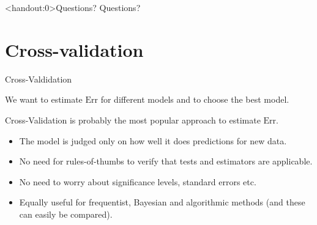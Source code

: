 \documentclass[10pt,handout]{beamer}
\begin{document}
\begin{frame}<handout:0>{Questions?}
Questions?
\end{frame}


\section{Cross-validation}
\frame{\sectionpage}


\begin{frame}{Cross-Valdidation}


We want to estimate $\text{Err}$ for different models and to choose the best model.\\[3mm]\pause

Cross-Validation is probably the most popular approach to estimate $\text{Err}$.

\begin{itemize}
\item The model is judged only on how well it does predictions for new data.\\[2mm]\pause
\item No need for rules-of-thumbs to verify that tests and estimators are applicable.\\[2mm]\pause
\item No need to worry about significance levels, standard errors etc.\\[2mm]\pause
\item Equally useful for frequentist, Bayesian and algorithmic methods (and these can easily be compared).\\[3mm]\pause
\end{itemize}


\end{frame}
\end{document}
